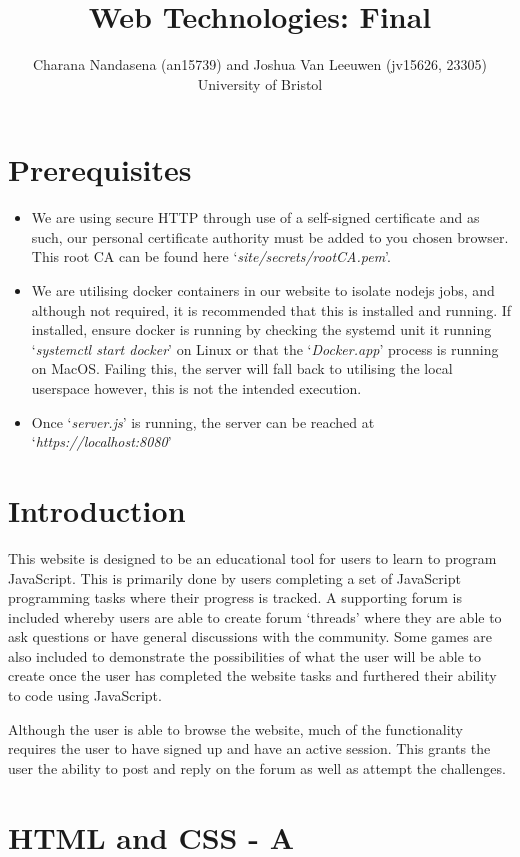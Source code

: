 \documentclass[a4paper]{article}
\title{Web Technologies: Final}
\author{Charana Nandasena (an15739) and Joshua Van Leeuwen (jv15626, 23305) University of Bristol}
\begin{document}
\maketitle

\section{Prerequisites}
\begin{itemize}
  \item{We are using secure HTTP through use of a self-signed certificate and as
    such, our personal certificate authority must be added to you chosen
    browser. This root CA can be found here `\textit{site/secrets/rootCA.pem}'.}
  \item{We are utilising docker containers in our website to isolate nodejs
    jobs, and although not required, it is recommended that this is installed
    and running. If installed, ensure docker is running by checking the
    systemd unit it running `\textit{systemctl start docker}' on Linux or that the
    `\textit{Docker.app}' process is running on MacOS. Failing this, the server
    will fall back to utilising the local userspace however, this is not the
    intended execution.}
  \item{Once `\textit{server.js}' is running, the server can be reached at
    `\textit{https://localhost:8080}'}
\end{itemize}

\section {Introduction}
This website is designed to be an educational tool for users to learn to program
JavaScript. This is primarily done by users completing a set of JavaScript
programming tasks where their progress is tracked. A supporting forum is
included whereby users are able to create forum `threads' where they are able to
ask questions or have general discussions with the community. Some games are
also included to demonstrate the possibilities of what the user will be able to
create once the user has completed the website tasks and furthered their ability
to code using JavaScript.

Although the user is able to browse the website, much of the functionality
requires the user to have signed up and have an active session. This grants the
user the ability to post and reply on the forum as well as attempt the
challenges.

\section {HTML and CSS - A}
\end{document}
